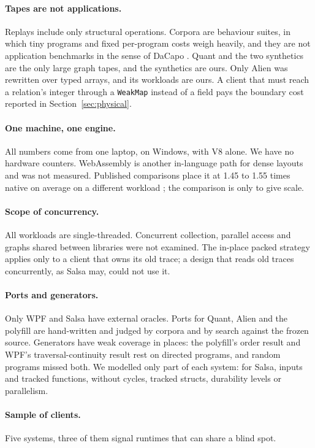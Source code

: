 \documentclass[11pt]{article}
\begin{document}
\paragraph{Tapes are not applications.} Replays include only structural operations. Corpora are behaviour suites, in which tiny programs and fixed per-program costs weigh heavily, and they are not application benchmarks in the sense of DaCapo \cite{blackburn2006}. Quant and the two synthetics are the only large graph tapes, and the synthetics are ours. Only Alien was rewritten over typed arrays, and its workloads are ours. A client that must reach a relation's integer through a \texttt{WeakMap} instead of a field pays the boundary cost reported in Section~\ref{sec:physical}.

\paragraph{One machine, one engine.} All numbers come from one laptop, on Windows, with V8 alone. We have no hardware counters. WebAssembly \cite{haas2017} is another in-language path for dense layouts and was not measured. Published comparisons place it at 1.45 to 1.55 times native on average on a different workload \cite{jangda2019}; the comparison is only to give scale.

\paragraph{Scope of concurrency.} All workloads are single-threaded. Concurrent collection, parallel access and graphs shared between libraries were not examined. The in-place packed strategy applies only to a client that owns its old trace; a design that reads old traces concurrently, as Salsa may, could not use it.

\paragraph{Ports and generators.} Only WPF and Salsa have external oracles. Ports for Quant, Alien and the polyfill are hand-written and judged by corpora and by search against the frozen source. Generators have weak coverage in places: the polyfill's order result and WPF's traversal-continuity result rest on directed programs, and random programs missed both. We modelled only part of each system: for Salsa, inputs and tracked functions, without cycles, tracked structs, durability levels or parallelism.

\paragraph{Sample of clients.} Five systems, three of them signal runtimes that can share a blind spot.
\end{document}
